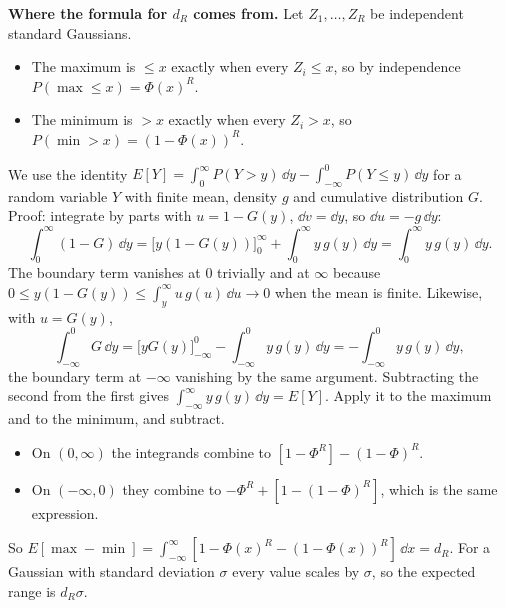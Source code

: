 \begin{beyond}
\textbf{Where the formula for $d_R$ comes from.} Let $Z_1,\dots,Z_R$ be independent standard Gaussians.
\begin{itemize}
\item The maximum is $\le x$ exactly when every $Z_i\le x$, so by independence $P(\max\le x)=\Phi(x)^R$.
\item The minimum is $>x$ exactly when every $Z_i>x$, so $P(\min>x)=(1-\Phi(x))^R$.
\end{itemize}
We use the identity $E[Y]=\int_0^\infty P(Y>y)\,\dd y-\int_{-\infty}^0P(Y\le y)\,\dd y$ for a random variable $Y$ with finite mean, density $g$ and cumulative distribution $G$. Proof: integrate by parts with $u=1-G(y)$, $\dd v=\dd y$, so $\dd u=-g\,\dd y$:
\[
\int_0^\infty(1-G)\,\dd y=\big[y(1-G(y))\big]_0^\infty+\int_0^\infty y\,g(y)\,\dd y=\int_0^\infty y\,g(y)\,\dd y .
\]
The boundary term vanishes at $0$ trivially and at $\infty$ because $0\le y(1-G(y))\le\int_y^\infty u\,g(u)\,\dd u\to0$ when the mean is finite. Likewise, with $u=G(y)$,
\[
\int_{-\infty}^0G\,\dd y=\big[yG(y)\big]_{-\infty}^0-\int_{-\infty}^0y\,g(y)\,\dd y=-\int_{-\infty}^0y\,g(y)\,\dd y ,
\]
the boundary term at $-\infty$ vanishing by the same argument. Subtracting the second from the first gives $\int_{-\infty}^\infty y\,g(y)\,\dd y=E[Y]$. Apply it to the maximum and to the minimum, and subtract.
\begin{itemize}
\item On $(0,\infty)$ the integrands combine to $[1-\Phi^R]-(1-\Phi)^R$.
\item On $(-\infty,0)$ they combine to $-\Phi^R+[1-(1-\Phi)^R]$, which is the same expression.
\end{itemize}
So $E[\max-\min]=\int_{-\infty}^{\infty}[1-\Phi(x)^R-(1-\Phi(x))^R]\,\dd x=d_R$. For a Gaussian with standard deviation $\sigma$ every value scales by $\sigma$, so the expected range is $d_R\sigma$.
\end{beyond}

